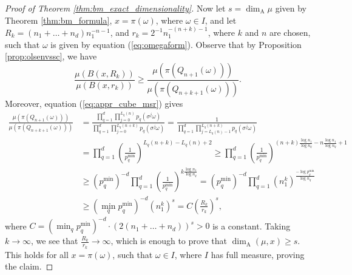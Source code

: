 \documentclass{PRM}
\newcommand{\adim}{\dim_{\mathrm{A}}}
\theoremstyle{plain}
\theoremstyle{definition}
\theoremstyle{remark}
\begin{document}
\begin{proof}[Proof of Theorem \ref{thm:bm_exact_dimensionality}]
Now let $s=\adim\mu$ given by Theorem \ref{thm:bm_formula}, $x=\pi(\omega)$, where $\omega\in I$, and let $R_k=(n_1+\ldots+n_d)n_1^{-n-1}$, and $r_k=2^{-1}n_1^{-(n+k)-1}$, where $k$ and $n$ are chosen, such that $\omega$ is given by equation (\ref{eq:omegaform}). Observe that by Proposition \ref{prop:olsenvssc}, we have
\begin{equation*}
    \frac{\mu(B(x,R_k))}{\mu(B(x,r_k))}\geq \frac{\mu(\pi(Q_{n+1}(\omega)))}{\mu(\pi(Q_{n+k+1}(\omega)))}.
\end{equation*}
Moreover, equation (\ref{eq:appr_cube_msr}) gives
\begin{align*}
    \frac{\mu(\pi(Q_{n+1}(\omega)))}{\mu(\pi(Q_{n+k+1}(\omega)))}&=\frac{\prod_{q=1}^d\prod_{j=0}^{L_q(n)}p_q(\sigma^j\omega)}{\prod_{q=1}^d\prod_{j=0}^{L_q(n+k)}p_q(\sigma^j\omega)}=\frac{1}{\prod_{q=1}^d\prod_{j=L_q(n)-1}^{L_q(n+k)}p_q(\sigma^j\omega)}\\
    &=\prod_{q=1}^d\left(\frac{1}{p_q^{\min}}\right)^{L_q(n+k)-L_q(n)+2}\geq \prod_{q=1}^d\left(\frac{1}{p_q^{\min}}\right)^{(n+k)\frac{\log n_1}{\log n_q}-n\frac{\log n_1}{\log n_q}+1}\\
    &\geq (p_q^{\min})^{-d}\prod_{q=1}^d\left(\frac{1}{p_q^{\min}}\right)^{k\frac{\log n_1}{\log n_q}}=(p_q^{\min})^{-d}\prod_{q=1}^d\left(n_1^k\right)^{\frac{-\log p_q^{\min}}{\log n_q}}\\
    &\geq (\min_{q}p_q^{\min})^{-d}\left(n_1^k\right)^{s}=C\left(\frac{R_k}{r_k}\right)^{s},
\end{align*}
where $C=(\min_{q}p_q^{\min})^{-d}\cdot(2(n_1+\ldots+n_d))^s>0$ is a constant. Taking $k\to\infty$, we see that $\frac{R_k}{r_k}\to \infty$, which is enough to prove that $\dim_{\mathrm{A}}(\mu,x)\geq s$. This holds for all $x=\pi(\omega)$, such that $\omega\in I$, where $I$ has full measure, proving the claim.
\end{proof}
\end{document}
